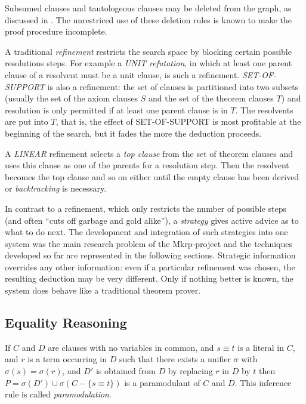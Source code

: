 Subsumed clauses and tautologeous clauses may be deleted from the
graph, as discussed in \cite [sections 6.3.3 and 6.3.4]{Raph84}. The
unrestriced use of these deletion rules is known to make the proof
procedure incomplete.

A traditional {\em refinement\/} restricts the search space by
blocking certain possible resolutions steps. For example a  {\em UNIT refutation\/}, in which at least one parent
clause of a resolvent must be a unit clause, is such a refinement.
{\em SET-OF-SUPPORT\/}  is also a refinement:
the set of clauses is partitioned into two subsets (usually the set of
the axiom clauses $S$ and the set of the theorem clauses $T$) and
resolution is only permitted if at least one parent clause is in $T$.
The resolvents are put into $T$, that is, the effect of SET-OF-SUPPORT
is most profitable at the beginning of the search, but it fades the
more the deduction proceeds.

A {\em LINEAR\/}  refinement selects a {\em top 
clause\/} from the set of theorem clauses and uses this clause as one 
of the parents for a resolution step. Then the resolvent becomes the top clause and so on either until the 
empty clause has been derived or {\em backtracking\/} is necessary.

In contrast to a refinement, which only restricts the number of possible steps (and often ``cuts off 
garbage and gold alike''), a {\em strategy\/} gives active advice as to what to do next. The development and 
integration of such strategies into one system was the main research problem of the {\sc Mkrp}-project and 
the techniques developed so far are represented in the following sections. Strategic information 
overrides any other information: even if a particular refinement was chosen, the resulting deduction 
may be very different. Only if nothing better is known, the system does behave like a traditional 
theorem prover.

\subsection{Equality Reasoning}
\label{EqualityReasoning}

If $C$ and $D$ 
are clauses with no variables in common, and $s \equiv t$ 
is a literal in $C$, and $r$ is a term occurring in $D$ such that there 
exists a unifier $\sigma$ with $\sigma(s) = \sigma(r)$, and $D'$ is 
obtained from $D$ by replacing $r$ in $D$ by $t$ then $P = \sigma(D') \cup  
\sigma(C-\{ s \equiv t\})$ is a paramodulant of $C$ and $D$. 
This inference rule is called   {\em paramodulation\/}.

